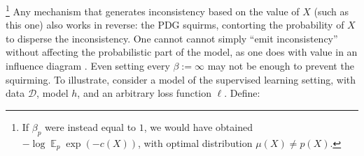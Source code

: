 \documentclass[twoside]{article}
\theoremstyle{plain}
\theoremstyle{definition}
\DeclareMathOperator*{\Ex}{\mathbb{E}} %
\newcommand{\dg}[1]{\mathbdcal{#1}}
\begin{document}
\footnote{If $\beta_p$ were instead equal to $1$, we would have obtained $-\log \Ex_p \exp(-c(\!X\!))$, with optimal distribution $\mu(\!X\!) \!\ne\! p(\!X\!)$.}
Any mechanism that generates inconsistency based on the value of $X$ (such as this one) also works in reverse: the PDG squirms, contorting the probability of $X$ to disperse the inconsistency.
One cannot cannot simply ``emit inconsistency''
without affecting the probabilistic part of the model,
as one does with value in an influence diagram \parencite{influencediagrams}.
%
%
Even setting every $\beta := \infty$ may not be enough to prevent the squirming.
\def\mypdg{\dg{S}}
To illustrate, consider a model of the supervised learning setting, with data $\mathcal D$, model $h$, and an arbitrary loss function $\ell$. Define:
\vspace{-1ex}
\end{document}
